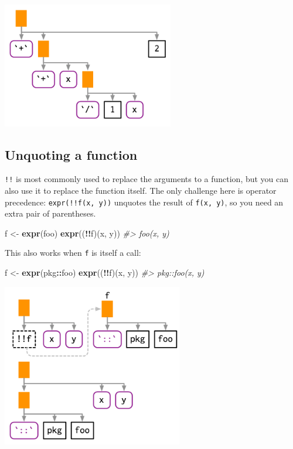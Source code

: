 \documentclass[]{book}
\newenvironment{Shaded}{\begin{snugshade}}{\end{snugshade}}
\newcommand{\CommentTok}[1]{\textcolor[rgb]{0.37,0.37,0.37}{\textit{#1}}}
\newcommand{\KeywordTok}[1]{\textcolor[rgb]{0.27,0.27,0.27}{\textbf{#1}}}
\newcommand{\NormalTok}[1]{#1}
\newcommand{\OperatorTok}[1]{\textcolor[rgb]{0.43,0.43,0.43}{\textbf{#1}}}
\newcommand{\StringTok}[1]{\textcolor[rgb]{0.5,0.5,0.5}{#1}}
\begin{document}
\begin{center}\includegraphics[width=2.95in]{diagrams/quotation/infix-bad} \end{center}

\hypertarget{unquoting-a-function}{%
\subsection{Unquoting a function}\label{unquoting-a-function}}


\texttt{!!} is most commonly used to replace the arguments to a function, but you can also use it to replace the function itself. The only challenge here is operator precedence: \texttt{expr(!!f(x,\ y))} unquotes the result of \texttt{f(x,\ y)}, so you need an extra pair of parentheses.

\begin{Shaded}
\begin{Highlighting}[]
\NormalTok{f <-}\StringTok{ }\KeywordTok{expr}\NormalTok{(foo)}
\KeywordTok{expr}\NormalTok{((}\OperatorTok{!!}\NormalTok{f)(x, y))}
\CommentTok{#> foo(x, y)}
\end{Highlighting}
\end{Shaded}

This also works when \texttt{f} is itself a call:

\begin{Shaded}
\begin{Highlighting}[]
\NormalTok{f <-}\StringTok{ }\KeywordTok{expr}\NormalTok{(pkg}\OperatorTok{::}\NormalTok{foo)}
\KeywordTok{expr}\NormalTok{((}\OperatorTok{!!}\NormalTok{f)(x, y))}
\CommentTok{#> pkg::foo(x, y)}
\end{Highlighting}
\end{Shaded}

\begin{center}\includegraphics[width=3.1in]{diagrams/quotation/fun} \end{center}
\end{document}
